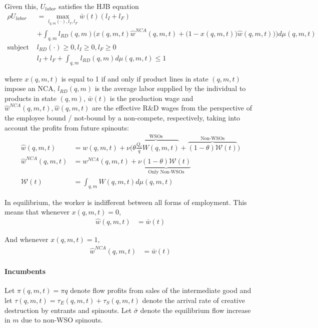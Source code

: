 \documentclass[12pt,english]{article}
\theoremstyle{remark}
\begin{document}
Given this, $U_{labor}$ satisfies the HJB equation
\begin{align}
\rho U_{labor} &= \max_{l_{q,m}(\cdot),l_I,l_F} \bar{w}(t) (l_I + l_F) \nonumber\\
&+ \int_{q,m} l_{RD} (q,m) \Bigg(x(q,m,t) \hat{w}^{NCA}(q,m,t) + \Big(1-x(q,m,t) \Big)\hat{w}(q,m,t))  \Bigg) d\mu(q,m,t) \nonumber  \\
\textrm{subject to: }  & l_{RD}(\cdot) \ge 0, l_I \ge 0, l_F \ge 0  \nonumber \\
& l_I + l_F + \int_{q,m} l_{RD}(q,m) d\mu(q,m,t) \le 1 
\end{align}

where $x(q,m,t)$ is equal to 1 if and only if product lines in state $(q,m,t)$ impose an NCA, $l_{RD}(q,m)$ is the average labor supplied by the individual to products in state $(q,m)$,  $\bar{w}(t)$ is the production wage and $\hat{w}^{NCA}(q,m,t),\hat{w}(q,m,t)$ are the effective R\&D wages from the perspective of the employee bound / not-bound by a non-compete, respectively, taking into account the profits from future spinouts: 
\begin{align}
\hat{w}(q,m,t) &=  w(q,m,t) + \nu \Big( \overbrace{\theta \frac{Q_t}{q} W(q,m,t)}^{\textrm{WSOs}} + \overbrace{(1-\theta) \mathcal{W}(t)}^{\textrm{Non-WSOs}} \Big) \label{worker_effective_wage}\\
\hat{w}^{NCA}(q,m,t) &= w^{NCA}(q,m,t) + \nu \underbrace{(1-\theta) \mathcal{W}(t)}_{\textrm{Only Non-WSOs}} \label{worker_effective_wage_NCA}\\ 
\mathcal{W}(t) &= \int_{q,m} W(q,m,t) d\mu(q,m,t)
\end{align}

In equilibrium, the worker is indifferent between all forms of employment. This means that whenever
$x(q,m,t) = 0$, 
\begin{align}
\hat{w}(q,m,t) &= \bar{w}(t) \label{wage_rd}
\end{align}

And whenever $x(q,m,t) = 1$, 
\begin{align}
\hat{w}^{NCA}(q,m,t) &= \bar{w}(t) \label{wage_rd_NCA}
\end{align}



\paragraph{Incumbents}

Let $\pi(q,m,t) = \pi q$ denote flow profits from sales of the intermediate good and let $\tau(q,m,t) = \tau_E(q,m,t) + \tau_S(q,m,t)$ denote the arrival rate of creative destruction by entrants and spinouts. Let $\bar{\sigma}$ denote the equilibrium flow increase in $m$ due to non-WSO spinouts. 
\end{document}
